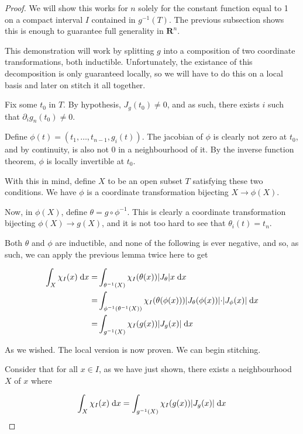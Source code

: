 \documentclass[11pt]{article}
\theoremstyle{definition}
\theoremstyle{plain}
\newcommand{\R}{\mathbf{R}}
\newcommand{\mo}{^{-1}}
\begin{document}
\begin{proof}
We will show this works for $n$ solely for the constant function equal to 1 on a compact interval $I$ contained in $g\mo(T)$. The previous subsection shows this is enough to guarantee full generality in $\R^n$.

This demonstration will work by splitting $g$ into a composition of two coordinate transformations, both inductible. Unfortunately, the existance of this decomposition is only guaranteed locally, so we will have to do this on a local basis and later on stitch it all together.

Fix some $t_0$ in $T$. By hypothesis, $J_g(t_0) \neq 0$, and as such, there exists $i$ such that $\partial_i g_n(t_0) \neq 0$.

Define $\phi(t) = (t_1, \ldots, t_{n-1}, g_i(t))$. The jacobian of $\phi$ is clearly not zero at $t_0$, and by continuity, is also not 0 in a neighbourhood of it. By the inverse function theorem, $\phi$ is locally invertible at $t_0$.

With this in mind, define $X$ to be an open subset $T$ satisfying these two conditions. We have $\phi$ is a coordinate transformation bijecting $X \rightarrow \phi(X)$.

Now, in $\phi(X)$, define $\theta = g \circ \phi\mo$. This is clearly a coordinate transformation bijecting $\phi(X) \rightarrow g(X)$, and it is not too hard to see that $\theta_i(t) = t_n$. %

Both $\theta$ and $\phi$ are inductible, and none of the following is ever negative, and so, as such, we can apply the previous lemma twice here to get

\begin{align*}
\int_X \chi_I(x) \d x =& \int_{\theta\mo(X)} \chi_I(\theta(x)) \rvert J_{\theta} \lvert x \d x \\
=& \int_{\phi\mo(\theta\mo(X))} \chi_I(\theta(\phi(x))) \rvert J_{\theta}(\phi(x)) \lvert \cdot \rvert J_\phi(x) \lvert \d x \\
=& \int_{g\mo(X)} \chi_I(g(x)) \rvert J_g(x) \lvert \d x
\end{align*}

As we wished. The local version is now proven. We can begin stitching.

Consider that for all $x \in I$, as we have just shown, there exists a neighbourhood $X$ of $x$ where

\[ \int_X \chi_I(x) \d x = \int_{g\mo(X)} \chi_I(g(x)) \rvert J_g(x) \lvert \d x \]


\end{proof}
\end{document}
